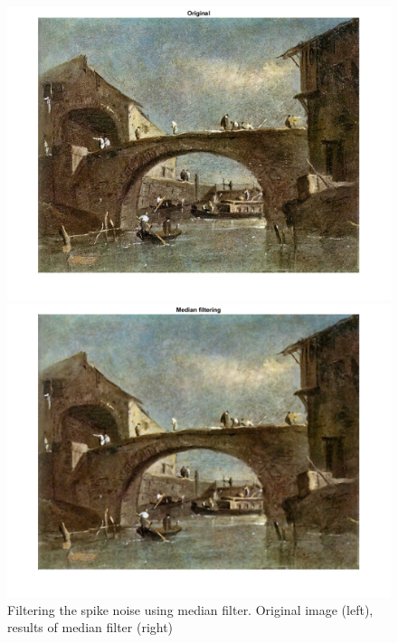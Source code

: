 \documentclass[conference]{IEEEtran}
\begin{document}
\begin{figure}[ht]
\begin{multicols}{2}
    \includegraphics[width=\linewidth]{med21.png}\par 
    \includegraphics[width=\linewidth]{med22.png}\par 
    \end{multicols}
\caption{Filtering the spike noise using median filter. Original image (left), results of median filter (right)}
\label{med_2}
\end{figure}
\end{document}
